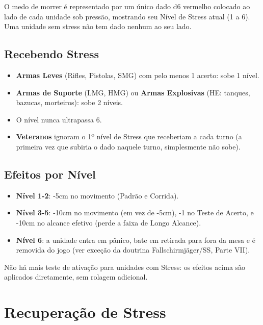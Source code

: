 O medo de morrer é representado por um único dado d6 vermelho colocado ao lado de cada unidade sob pressão, mostrando seu Nível de Stress atual (1 a 6). Uma unidade sem stress não tem dado nenhum ao seu lado.

\subsection{Recebendo Stress}

\begin{itemize}[leftmargin=1.2cm]
  \item \textbf{Armas Leves} (Rifles, Pistolas, SMG) com pelo menos 1 acerto: sobe 1 nível.
  \item \textbf{Armas de Suporte} (LMG, HMG) ou \textbf{Armas Explosivas} (HE: tanques, bazucas, morteiros): sobe 2 níveis.
  \item O nível nunca ultrapassa 6.
  \item \textbf{Veteranos} ignoram o 1º nível de Stress que receberiam a cada turno (a primeira vez que subiria o dado naquele turno, simplesmente não sobe).
\end{itemize}

\subsection{Efeitos por Nível}

\begin{itemize}[leftmargin=1.2cm]
  \item \textbf{Nível 1-2}: -5cm no movimento (Padrão e Corrida).
  \item \textbf{Nível 3-5}: -10cm no movimento (em vez de -5cm), -1 no Teste de Acerto, e -10cm no alcance efetivo (perde a faixa de Longo Alcance).
  \item \textbf{Nível 6}: a unidade entra em pânico, bate em retirada para fora da mesa e é removida do jogo (ver exceção da doutrina Fallschirmjäger/SS, Parte VII).
\end{itemize}

\begin{nota}
Não há mais teste de ativação para unidades com Stress: os efeitos acima são aplicados diretamente, sem rolagem adicional.
\end{nota}

\section{Recuperação de Stress}

